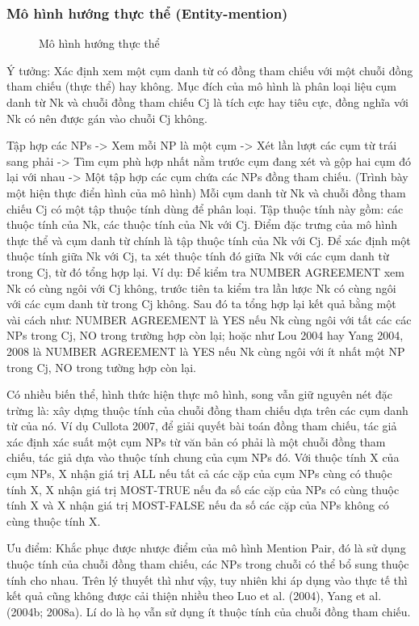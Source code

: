 \documentclass[12pt]{extarticle}
\begin{document}
			\subsubsection*{Mô hình hướng thực thể (Entity-mention)}
				\begin{figure}[H]
					\centering
					
					\caption{Mô hình hướng thực thể}
				\end{figure}
				\par Ý tưởng: Xác định xem một cụm danh từ có đồng tham chiếu với một chuỗi đồng tham chiếu (thực thể) hay không. Mục đích của mô hình là phân loại liệu cụm danh từ Nk và chuỗi đồng tham chiếu Cj là tích cực hay tiêu cực, đồng nghĩa với Nk có nên được gán vào chuỗi Cj không.
				\par Tập hợp các NPs -> Xem mỗi NP là một cụm -> Xét lần lượt các cụm từ trái sang phải -> Tìm cụm phù hợp nhất nằm trước cụm đang xét và gộp hai cụm đó lại với nhau -> Một tập hợp các cụm chứa các NPs đồng tham chiếu. (Trình bày một hiện thực điển hình của mô hình)
				Mỗi cụm danh từ Nk và chuỗi đồng tham chiếu Cj có một tập thuộc tính dùng để phân loại. Tập thuộc tính này gồm: các thuộc tính của Nk, các thuộc tính của Nk với Cj. Điểm đặc trưng của mô hình thực thể và cụm danh từ chính là tập thuộc tính của Nk với Cj. Để xác định một thuộc tính giữa Nk với Cj, ta xét thuộc tính đó giữa Nk với các cụm danh từ trong Cj, từ đó tổng hợp lại. Ví dụ: Để kiểm tra NUMBER AGREEMENT xem Nk có cùng ngôi với Cj không, trước tiên ta kiểm tra lần lược Nk có cùng ngôi với các cụm danh từ trong Cj không. Sau đó ta tổng hợp lại kết quả bằng một vài cách như: NUMBER AGREEMENT là YES nếu Nk cùng ngôi với tất các các NPs trong Cj, NO trong trường hợp còn lại; hoặc như Lou 2004 hay Yang 2004, 2008 là NUMBER AGREEMENT là YES nếu Nk cùng ngôi với ít nhất một NP trong Cj, NO trong tường hợp còn lại. 
				\par Có nhiều biến thể, hình thức hiện thực mô hình, song vẫn giữ nguyên nét đặc trừng là: xây dựng thuộc tính của chuỗi đồng tham chiếu dựa trên các cụm danh từ của nó. Ví dụ Cullota 2007, để giải quyết bài toán đồng tham chiếu, tác giả xác định xác suất một cụm NPs từ văn bản có phải là một chuỗi đồng tham chiếu, tác giả dựa vào thuộc tính chung của cụm NPs đó. Với thuộc tính X của cụm NPs, X nhận giá trị ALL nếu tất cả các cặp của cụm NPs cùng có thuộc tính X, X nhận giá trị MOST-TRUE nếu đa số các cặp của NPs có cùng thuộc tính X và X nhận giá trị MOST-FALSE nếu đa số các cặp của NPs không có cùng thuộc tính X. 
				\par Ưu điểm: Khắc phục được nhược điểm của mô hình Mention Pair, đó là sử dụng thuộc tính của chuỗi đồng tham chiếu, các NPs trong chuỗi có thể bổ sung thuộc tính cho nhau. Trên lý thuyết thì như vậy, tuy nhiên khi áp dụng vào thực tế thì kết quả cũng không được cải thiện nhiều theo Luo et al. (2004), Yang et al. (2004b; 2008a). Lí do là họ vẫn sử dụng ít thuộc tính của chuỗi đồng tham chiếu.
\end{document}

